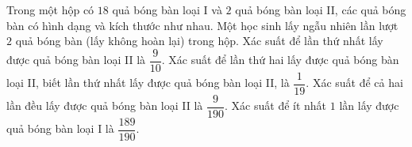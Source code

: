 \begin{ex}
Trong một hộp có $18$ quả bóng bàn loại I và $2$ quả bóng bàn loại II, các quả bóng bàn có hình dạng và kích thước như nhau. Một học sinh lấy ngẫu nhiên lần lượt $2$ quả bóng bàn (lấy không hoàn lại) trong hộp.
\choiceTF
{Xác suất để lần thứ nhất lấy được quả bóng bàn loại II là $\dfrac9{10}$.}
{\True Xác suất để lần thứ hai lấy được quả bóng bàn loại II, biết lần thứ nhất lấy được quả bóng bàn loại II, là $\dfrac1{19}$.}
{Xác suất để cả hai lần đều lấy được quả bóng bàn loại II là $\dfrac9{190}$.}
{\True Xác suất để ít nhất $1$ lần lấy được quả bóng bàn loại I là $\dfrac{189}{190}$.}
\end{ex}
